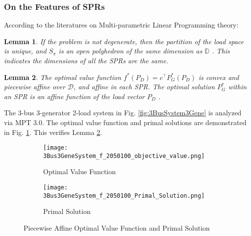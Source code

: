\documentclass[letterpaper, 11pt]{article}
\theoremstyle{plain}
\newtheorem{lem}{Lemma}
\theoremstyle{definition}
\begin{document}
\subsubsection{On the Features of SPRs} \label{ssub:on_the_features_of_sprs}
According to the literatures on Multi-parametric Linear Programming theory:
\begin{lem}
If the problem is not degenerate, then the partition of the load space is unique, and $S_{\pi}$  is an open polyhedron of the same dimension as $\mathbb{D}$ \cite{filippi1997geometry}. This indicates the dimensions of all the SPRs are the same.
\end{lem}
\begin{lem}
\label{lem:affine_solution_MLP}
The optimal value function $f^*(P_D) = c^\intercal  P_G^*(P_D)$ is convex and piecewise affine over $\mathcal{D}$, and affine in each SPR. The optimal solution $P_G^*$ within an SPR is an affine function of the load vector $P_D$ \cite{gal1995postoptimal}.
\end{lem}
The 3-bus 3-generator 2-load system in Fig. \ref{fig:3BusSystem3Gene} is analyzed via MPT 3.0. The optimal value function and primal solutions are demonstrated in Fig. \ref{fig:affine_solution_MLP}. This verifies Lemma \ref{lem:affine_solution_MLP}.

\begin{figure}[htbp]
  \centering
\begin{subfigure}[t]{0.49\linewidth}
  \texttt{[image: 3Bus3GeneSystem\_f\_2050100\_objective\_value.png]}
  \caption{Optimal Value Function}
\end{subfigure}
\begin{subfigure}[t]{0.49\linewidth}
  \texttt{[image: 3Bus3GeneSystem\_f\_2050100\_Primal\_Solution.png]}
  \caption{Primal Solution}
\end{subfigure}
  \caption{Piecewise Affine Optimal Value Function and Primal Solution}
  \label{fig:affine_solution_MLP}
\end{figure}
\end{document}
